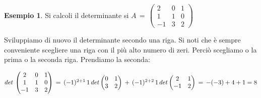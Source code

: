 \documentclass[a4paper]{report}
\theoremstyle{remark}
\theoremstyle{definition}
\newtheorem{es}{Esempio}
\begin{document}
\begin{es}
	Si calcoli il determinante si $A\,=\,
	\begin{pmatrix}
		2 & 0 & 1\\
		1 & 1 & 0\\
		-1 & 3 & 2
	\end{pmatrix}$
	
	Sviluppiamo di nuovo il determinante secondo una riga. Si noti che è sempre conveniente scegliere una riga con il più alto numero di zeri. Perciò scegliamo o la prima o la seconda riga. Prendiamo la seconda:
	
	$det\,\begin{pmatrix}
		2 & 0 & 1\\
		1 & 1 & 0\\
		-1 & 3 & 2
	\end{pmatrix}
	\,=\,(-1)^{2+1}\,1\,det
	\begin{pmatrix}
		0 & 1\\
		3 & 2\\
	\end{pmatrix}
	\,+\,(-1)^{2+2}\,1\,det
	\begin{pmatrix}
		2 & 1\\
		-1 & 2\\
	\end{pmatrix}\\
	=\,-(-3)+4+1=8$
\end{es}
%
\end{document}
